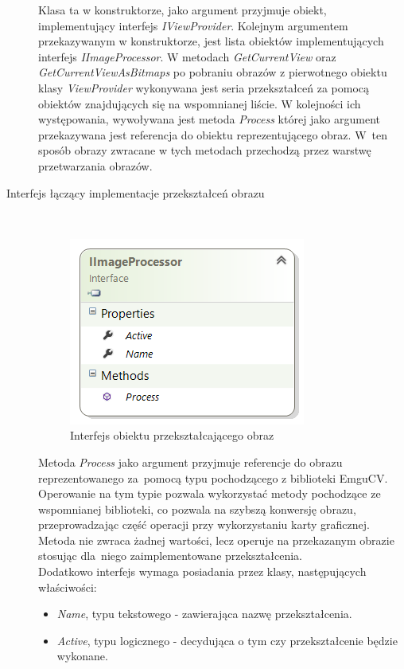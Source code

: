 \documentclass[a4paper,11pt,twoside]{report}
\theoremstyle{definition}
\begin{document}
\begin{description}
Klasa ta w konstruktorze, jako argument przyjmuje obiekt, implementujący interfejs \textit{IViewProvider}. Kolejnym argumentem przekazywanym w konstruktorze, jest lista obiektów implementujących interfejs \textit{IImageProcessor}. W metodach \textit{GetCurrentView} oraz \textit{GetCurrentViewAsBitmaps} po pobraniu obrazów z pierwotnego obiektu klasy \textit{ViewProvider} wykonywana jest seria przekształceń za pomocą obiektów znajdujących się na wspomnianej liście. W kolejności ich występowania, wywoływana jest metoda \textit{Process} której jako argument przekazywana jest referencja do obiektu reprezentującego obraz. W~ten sposób obrazy zwracane w tych metodach przechodzą przez warstwę przetwarzania obrazów.

\item [Interfejs łączący implementacje przekształceń obrazu] \hfill \\

\begin{figure}[h]
\centering
\includegraphics[scale=0.9]{images/IImageProcessor}
\caption[Przekształcenie diagram diagram]{Interfejs obiektu przekształcającego obraz}
\end{figure}

Metoda \textit{Process} jako argument przyjmuje referencje do obrazu reprezentowanego za~pomocą typu pochodzącego z biblioteki EmguCV. Operowanie na tym typie pozwala wykorzystać metody pochodzące ze wspomnianej biblioteki, co pozwala na szybszą konwersję obrazu, przeprowadzając część operacji przy wykorzystaniu karty graficznej. Metoda nie zwraca żadnej wartości, lecz operuje na przekazanym obrazie stosując dla~niego zaimplementowane przekształcenia.  \\
Dodatkowo interfejs wymaga posiadania przez klasy, następujących właściwości:
\begin{itemize}
\item  \textit{Name}, typu tekstowego - zawierająca nazwę przekształcenia.
\item \textit{Active}, typu logicznego -  decydująca o tym czy przekształcenie będzie wykonane.
\end{itemize}

\end{description}
\end{document}
